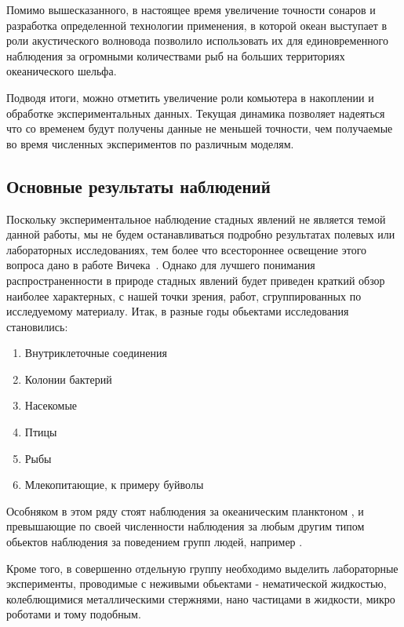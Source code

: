 	Помимо вышесказанного, в настоящее время увеличение точности сонаров и разработка определенной технологии применения, в которой океан выступает в роли акустического волновода позволило использовать их для единовременного наблюдения за огромными количествами рыб на больших территориях океанического шельфа. \cite{makris2006}

	Подводя итоги, можно отметить увеличение роли комьютера в накоплении и обработке экспериментальных данных. Текущая динамика позволяет надеяться что со временем будут получены данные не меньшей точности, чем получаемые во время численных экспериментов по различным моделям.

	\subsection{Основные результаты наблюдений} %
	\label{sub:ExperimentalResults}
	Поскольку экспериментальное наблюдение стадных явлений не является темой данной работы, мы не будем останавливаться подробно результатах полевых или лабораторных исследованиях, тем более что всестороннее освещение этого вопроса дано в работе Вичека~\cite{vicsek2012}. Однако для лучшего понимания распространенности в природе стадных явлений будет приведен краткий обзор наиболее характерных, с нашей точки зрения, работ, сгруппированных по исследуемому материалу. Итак, в разные годы обьектами исследования становились:
	\begin{enumerate}
		\item Внутриклеточные соединения \cite{chowdhury2006,keller1971}
		\item Колонии бактерий \cite{czirok1998,csahok1997}
		\item Насекомые \cite{buhl2006}
		\item Птицы \cite{ballerini2008,selous1931,dellariccia2008,biro2006,major1978,nagy2010}
		\item Рыбы \cite{cambui2012,makris2009,parrish1997}
		\item Млекопитающие, к примеру буйволы \cite{sinclair1977}
	\end{enumerate}
	Особняком в этом ряду стоят наблюдения за океаническим планктоном \cite{seuront2004}, и превышающие по своей численности наблюдения за любым другим типом обьектов наблюдения за поведением групп людей, например \cite{parisi2009,moussaid2011}.%

	Кроме того, в совершенно отдельную группу необходимо выделить лабораторные эксперименты, проводимые с неживыми обьектами - нематической жидкостью, колеблющимися металлическими стержнями, нано частицами в жидкости, микро роботами и тому подобным. \cite{schaller2010,turgut2008,blair2003}

